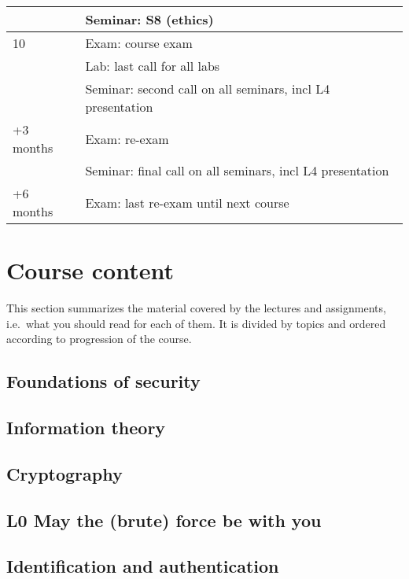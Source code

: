 \begin{table}
\begin{tabular}{lp{9cm}}
    & Seminar: S8 (ethics)\\
    \midrule
    10
    & Exam: course exam\\
    & Lab: last call for all labs\\
    & Seminar: second call on all seminars, incl L4 presentation\\
    \midrule
    +3 months
    & Exam: re-exam\\
    & Seminar: final call on all seminars, incl L4 presentation\\
    \midrule
    +6 months
    & Exam: last re-exam until next course\\
    \bottomrule
  \end{tabular}
\end{table}


\section{Course content}

This section summarizes the material covered by the lectures and assignments, 
i.e.\ what you should read for each of them.
It is divided by topics and ordered according to progression of the course.

\subsection{Foundations of security}


\subsection{Information theory}


\subsection{Cryptography}


\subsection{L0 May the (brute) force be with you}


\subsection{Identification and authentication}


